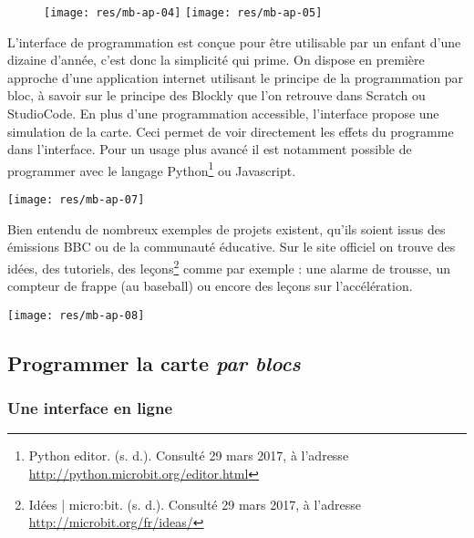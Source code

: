 \begin{figure}
    \centering
    \texttt{[image: res/mb-ap-04]}
    \hfill
    \texttt{[image: res/mb-ap-05]}
\end{figure}

L’interface de programmation est conçue pour être utilisable par un enfant d’une dizaine d’année, c’est donc la simplicité qui prime. On dispose en première approche d’une application internet utilisant le principe de la programmation par bloc, à savoir sur le principe des Blockly que l’on retrouve dans Scratch ou StudioCode. En plus d’une programmation accessible, l’interface propose une simulation de la carte. Ceci permet de voir directement les effets du programme dans l’interface. Pour un usage plus avancé il est notamment possible de programmer avec le langage Python\footnote{Python editor. (s. d.). Consulté 29 mars 2017, à l’adresse \url{http://python.microbit.org/editor.html}} ou Javascript.


\begin{minipage}[b]{0.45\linewidth}
    \vspace{0cm}
    \texttt{[image: res/mb-ap-07]}
\end{minipage}
\hfill
\begin{minipage}[b]{0.45\linewidth}
    Bien entendu de nombreux exemples de projets existent, qu’ils soient issus des émissions BBC ou de la communauté éducative. Sur le site officiel on trouve des idées, des tutoriels, des leçons\footnote{Idées | micro:bit. (s. d.). Consulté 29 mars 2017, à l’adresse \url{http://microbit.org/fr/ideas/}} comme par exemple : une alarme de trousse, un compteur de frappe (au baseball) ou encore des leçons sur l’accélération.
    \vspace{1em}
    \begin{center}
        \texttt{[image: res/mb-ap-08]}
    \end{center}
\end{minipage}


\subsection{Programmer la carte \mb \emph{par blocs}}

\subsubsection{Une interface en ligne}

